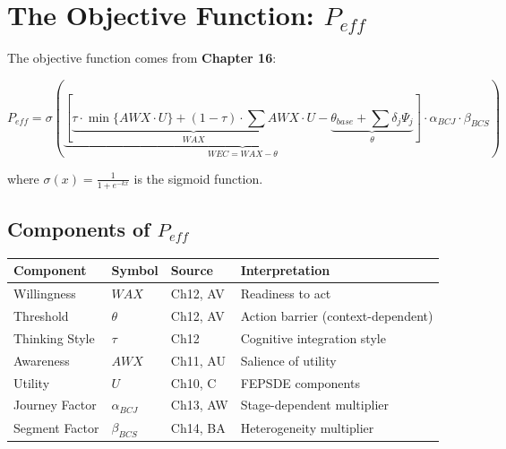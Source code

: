 \section{The Objective Function: $P_{eff}$}
\label{sec:mp-objective}

The objective function comes from \textbf{Chapter 16}:

\begin{equation}
\boxed{
P_{eff} = \sigma\left(
    \underbrace{
        \left[
            \underbrace{\tau \cdot \min\{AWX \cdot U\} + (1-\tau) \cdot \sum AWX \cdot U}_{WAX}
            - \underbrace{\theta_{base} + \sum \delta_j \Psi_j}_{\theta}
        \right]
    }_{WEC = WAX - \theta}
    \cdot \alpha_{BCJ} \cdot \beta_{BCS}
\right)
}
\label{eq:mp-peff}
\end{equation}

where $\sigma(x) = \frac{1}{1 + e^{-kx}}$ is the sigmoid function.

\subsection{Components of $P_{eff}$}

\begin{center}
\renewcommand{\arraystretch}{1.4}
\begin{tabular}{llll}
\toprule
\textbf{Component} & \textbf{Symbol} & \textbf{Source} & \textbf{Interpretation} \\
\midrule
Willingness & $WAX$ & Ch12, AV & Readiness to act \\
Threshold & $\theta$ & Ch12, AV & Action barrier (context-dependent) \\
Thinking Style & $\tau$ & Ch12 & Cognitive integration style \\
Awareness & $AWX$ & Ch11, AU & Salience of utility \\
Utility & $U$ & Ch10, C & FEPSDE components \\
Journey Factor & $\alpha_{BCJ}$ & Ch13, AW & Stage-dependent multiplier \\
Segment Factor & $\beta_{BCS}$ & Ch14, BA & Heterogeneity multiplier \\
\bottomrule
\end{tabular}
\end{center}


